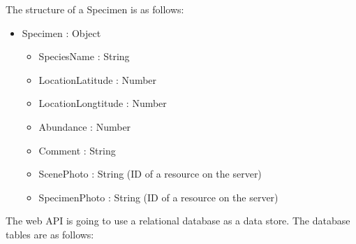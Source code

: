         The structure of a Specimen is as follows:
        \begin{itemize}
            \item Specimen : Object
            \begin{itemize}
                \item SpeciesName : String
                \item LocationLatitude : Number
                \item LocationLongtitude : Number
                \item Abundance : Number
                \item Comment : String
                \item ScenePhoto : String (ID of a resource on the server)
                \item SpecimenPhoto : String (ID of a resource on the server)
            \end{itemize}
        \end{itemize}

        The web API is going to use a relational database as a data store.
        The database tables are as follows:

